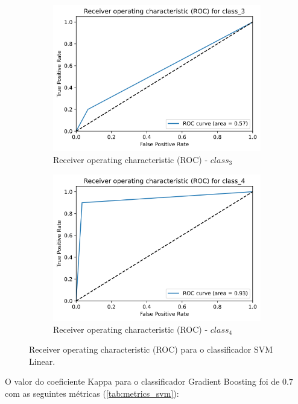 \documentclass[
	article,			%
	11pt,				%
	oneside,			%
	a4paper,			%
	english,			%
	brazil,				%
	sumario=tradicional
	]{abntex2}
\begin{document}
\begin{figure}[H]
\begin{subfigure}[b]{0.475\textwidth}
    \includegraphics[scale=0.375]{fig/svm_roc3.png}
    \caption{Receiver operating characteristic (ROC) - $class_3$}
    \label{fig:svm_roc3}
    \end{subfigure}
    \hfill
    \begin{subfigure}[b]{0.475\textwidth}
    \centering
    \includegraphics[scale=0.375]{fig/svm_roc4.png}
    \caption{Receiver operating characteristic (ROC) - $class_4$}
    \label{fig:svm_roc4}
    \end{subfigure}
    \caption{Receiver operating characteristic (ROC) para o classificador SVM Linear.}
    \label{svm_roc}
\end{figure}

O valor do coeficiente Kappa para o classificador Gradient Boosting foi de $0.7$ com as seguintes métricas (\ref{tab:metrics_svm}):
\end{document}
